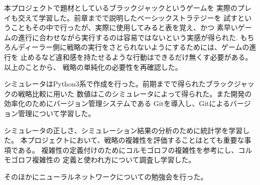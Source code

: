 本プロジェクトで題材としているブラックジャックというゲームを
実際のプレイも交えて学習した。前章までで説明したベーシックストラテジーを
試すということもその中で行ったが、実際に使用してみると表を覚え、かつ
素早いゲームの進行に合わせながら実行するのは容易ではないという実感が得られた.
もちろんディーラー側に戦略の実行をさとられないようにするためには、ゲームの進行を
止めるなど違和感を持たせるような行動はできるだけ無くす必要がある。以上のことから、
戦略の単純化の必要性を再確認した。

シミュレータはPython3系で作成を行った。前期までで得られたブラックジャックの戦略比較に用いた
数値はこのシミュレータによって得られた。また開発の効率化のためにバージョン管理システムである
Gitを導入し、Gitによるバージョン管理について学習した。

シミュレータの正しさ、シミュレーション結果の分析のために統計学を学習した。
本プロジェクトにおいて、戦略の複雑性を評価することはとても重要な事項である。
複雑性の定義付けのためにコルモゴロフの複雑性を参考にし、コルモゴロフ複雑性の
定義と使われ方について調査し学習した。

そのほかにニューラルネットワークについての勉強会を行った。


